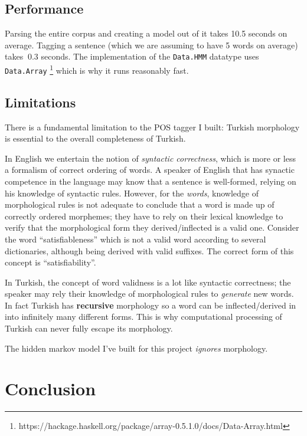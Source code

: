 \documentclass{article}
\begin{document}
\subsection{Performance}
Parsing the entire corpus and creating a model out of it takes 10.5 seconds on
average. Tagging a sentence (which we are assuming to have 5 words on average)
takes $~0.3$ seconds. The implementation of the \texttt{Data.HMM} datatype uses
\texttt{Data.Array}
\footnote{https://hackage.haskell.org/package/array-0.5.1.0/docs/Data-Array.html}
which is why it runs reasonably fast.

\subsection{Limitations}
There is a fundamental limitation to the POS tagger I built: Turkish morphology
is essential to the overall completeness of Turkish.

In English we entertain the notion of \emph{syntactic correctness}, which is
more or less a formalism of correct ordering of words. A speaker of English that has
synactic competence in the language \citep{bachman1990} may know that a sentence
is well-formed, relying on his knowledge of syntactic rules. However, for the
\textit{words}, knowledge of morphological rules is not adequate to conclude
that a word is made up of correctly ordered morphemes; they have to rely on
their lexical knowledge to verify that the morphological form they
derived/inflected is a valid one. Consider the word ``satisfiableness'' which
is not a valid word according to several dictionaries, although being derived
with valid suffixes. The correct form of this concept is ``satisfiability''.

In Turkish, the concept of word validness is a lot like syntactic correctness;
the speaker may rely their knowledge of morphological rules to \emph{generate}
new words. In fact Turkish has \textbf{recursive} morphology \citep{kabak2001}
so a word can be inflected/derived in into infinitely many different forms. This
is why computational processing of Turkish can never fully escape its
morphology.

The hidden markov model I've built for this project \emph{ignores} morphology.

\section{Conclusion}





\end{document}
